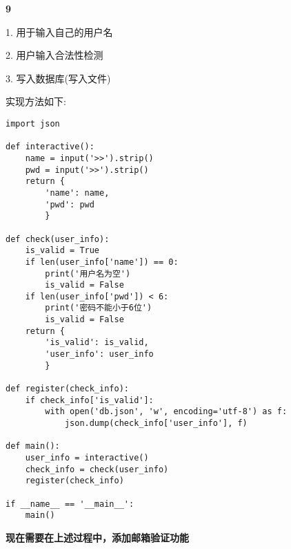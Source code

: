 \documentclass[cn,chinese,color=cyan]{elegantbook}
\begin{document}
\textbf{9}

















\begin{warning}[title={{\color{green} \faEnvira} 完成一个用户输入注册：\ }]
1. 用于输入自己的用户名

2. 用户输入合法性检测

3. 写入数据库(写入文件)
\end{warning}
实现方法如下:
\begin{code}
	\vspace{-10pt}
	\begin{lstlisting}[style=Python2]
import json

def interactive():
	name = input('>>').strip()
	pwd = input('>>').strip()
	return {
		'name': name,
		'pwd': pwd
		}

def check(user_info):
	is_valid = True
	if len(user_info['name']) == 0:
		print('用户名为空')
		is_valid = False
	if len(user_info['pwd']) < 6:
		print('密码不能小于6位')
		is_valid = False
	return {
		'is_valid': is_valid,
		'user_info': user_info
		}

def register(check_info):
	if check_info['is_valid']:
		with open('db.json', 'w', encoding='utf-8') as f:
			json.dump(check_info['user_info'], f)

def main():
	user_info = interactive()
	check_info = check(user_info)
	register(check_info)

if __name__ == '__main__':
	main()
	\end{lstlisting}
	\vspace{-10pt}
\end{code}

\textbf{现在需要在上述过程中，添加邮箱验证功能}
\end{document}
